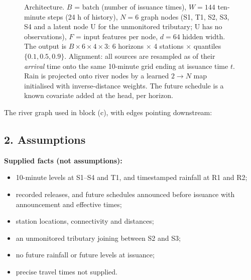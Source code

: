 \documentclass[11pt]{article}
\begin{document}
\begin{figure}[H]
{}
\caption{Architecture. $B$ = batch (number of issuance times), $W=144$ ten-minute steps (24 h of history), $N=6$ graph nodes (S1, T1, S2, S3, S4 and a latent node U for the unmonitored tributary; U has no observations), $F$ = input features per node, $d=64$ hidden width.
The output is $B\times6\times4\times3$: 6 horizons $\times$ 4 stations $\times$ quantiles $\{0.1,0.5,0.9\}$.
Alignment: all sources are resampled as of their \emph{arrival} time onto the same 10-minute grid ending at issuance time $t$. Rain is projected onto river nodes by a learned $2\to N$ map initialised with inverse-distance weights. The future schedule is a known covariate added at the head, per horizon.}
\label{fig:q1arch}
\end{figure}

\noindent The river graph used in block (c), with edges pointing downstream:

\begin{center}
\end{center}

\subsection*{2. Assumptions}

\textbf{Supplied facts (not assumptions):}
\begin{itemize}
  \item 10-minute levels at S1--S4 and T1, and timestamped rainfall at R1 and R2;
  \item recorded releases, and future schedules announced before issuance with announcement and effective times;
  \item station locations, connectivity and distances;
  \item an unmonitored tributary joining between S2 and S3;
  \item no future rainfall or future levels at issuance;
  \item precise travel times not supplied.
\end{itemize}
\end{document}
